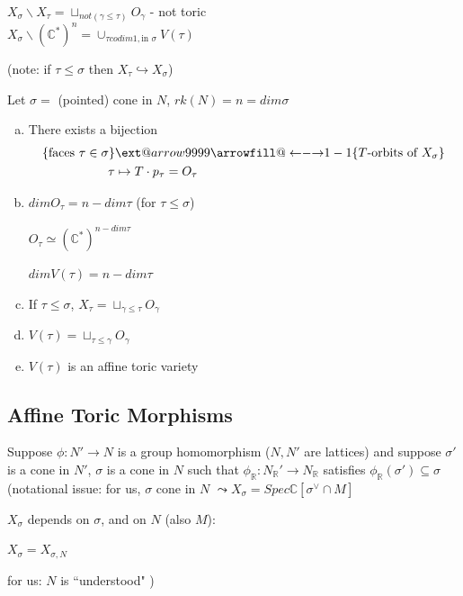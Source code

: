 \documentclass[a4paper,12pt]{amsart}
\makeatletter
\newcommand{\C}{\ensuremath{\mathbb{C}}}
\newcommand{\R}{\ensuremath{\mathbb{R}}}
\newcommand\xleftrightarrow[2][]{%
	\ext@arrow 9999{\longleftrightarrowfill@}{#1}{#2}}
\newcommand\longleftrightarrowfill@{%
	\arrowfill@\leftarrow\relbar\rightarrow}
\makeatother
\begin{document}
$ X_\sigma\backslash X_\tau =\sqcup_{not(\gamma\leq \tau)}O_\gamma $ - not toric
\\

$ X_\sigma \backslash (\C^*)^n = \cup_{\tau codim 1, \text{in }\sigma} V(\tau) $

(note: if $ \tau \leq \sigma$ then $ X_\tau \hookrightarrow X_\sigma $)
\\

\begin{Theorem}
	Let $ \sigma =$ (pointed) cone in $N$, $ rk(N)=n=dim\sigma $
	\begin{enumerate}[a)]
		\item There exists a bijection
		\begin{align*}
			\{\text{faces }\tau \in \sigma\} &\xleftrightarrow{1-1} \{T\text{-orbits of }X_\sigma\}\\
			\tau &\mapsto T\cdot p_\tau = O_\tau
		\end{align*}
		\item $dimO_\tau = n-dim\tau$ (for $\tau \leq \sigma$)
		
		$O_\tau \simeq (\C^*)^{n-dim\tau}$
		
		$dimV(\tau)=n-dim\tau$
		\item If $ \tau \leq \sigma$, $X_\tau=\sqcup_{\gamma\leq \tau} O_\gamma $
		\item $ V(\tau)=\sqcup_{\tau\leq\gamma} O_\gamma $
		\item $ V(\tau) $ is an affine toric variety
	\end{enumerate}
\end{Theorem}

\subsection{Affine Toric Morphisms}

Suppose $\phi:N'\to N$ is a group homomorphism ($N, N'$ are lattices) and suppose $\sigma'$ is a cone in $N'$, $\sigma$ is a cone in $N$ such that $\phi_\R: N_\R'\to N_\R$ satisfies $\phi_\R(\sigma')\subseteq \sigma$
\\

(notational issue: for us, $\sigma$ cone in $N$ $\leadsto X_\sigma = Spec\C[\sigma^\vee \cap M]$

$X_\sigma$ depends on $\sigma$, and on $N$ (also $M$):

$X_\sigma = X_{\sigma,N}$

for us: $N$ is ``understood"
)
\\
\end{document}
